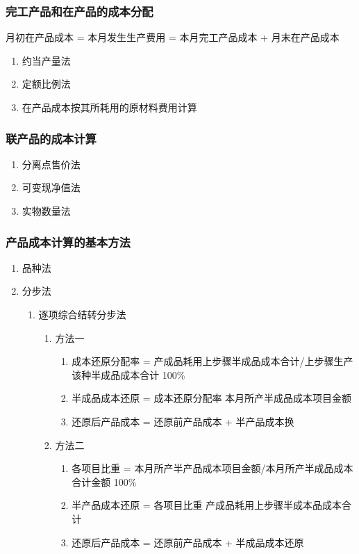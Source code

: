 \documentclass[12pt,a4paper]{article}
\begin{document}
\subsubsection{完工产品和在产品的成本分配}
\label{sec:orga51bacc}
月初在产品成本 = 本月发生生产费用 = 本月完工产品成本 + 月末在产品成本
\begin{enumerate}
\item 约当产量法
\label{sec:org7ba5b2e}
\item 定额比例法
\label{sec:orgb11b4d1}
\item 在产品成本按其所耗用的原材料费用计算
\label{sec:org31896c3}
\end{enumerate}
\subsubsection{联产品的成本计算}
\label{sec:org7d02e6f}
\begin{enumerate}
\item 分离点售价法
\label{sec:org4836b8f}
\item 可变现净值法
\label{sec:org3898a6c}
\item 实物数量法
\label{sec:org77a5a11}
\end{enumerate}
\subsubsection{产品成本计算的基本方法}
\label{sec:orgf095da7}
\begin{enumerate}
\item 品种法
\label{sec:org941eb4d}
\item 分步法
\label{sec:org6d5df62}
\begin{enumerate}
\item 逐项综合结转分步法
\label{sec:org292f262}
\begin{enumerate}
\item 方法一
\label{sec:org67815a7}
\begin{enumerate}
\item 成本还原分配率 = 产成品耗用上步骤半成品成本合计/上步骤生产该种半成品成本合计 \texttimes{} 100\%
\item 半成品成本还原 = 成本还原分配率 \texttimes{} 本月所产半成品成本项目金额
\item 还原后产品成本 = 还原前产品成本 + 半产品成本换
\end{enumerate}
\item 方法二
\label{sec:org66e2297}
\begin{enumerate}
\item 各项目比重 = 本月所产半产品成本项目金额/本月所产半成品成本合计金额 \texttimes{} 100\%
\item 半产品成本还原 = 各项目比重 \texttimes{} 产成品耗用上步骤半成本品成本合计
\item 还原后产品成本 = 还原前产品成本 + 半成品成本还原
\end{enumerate}
\end{enumerate}
\end{enumerate}
\end{enumerate}
\end{document}
